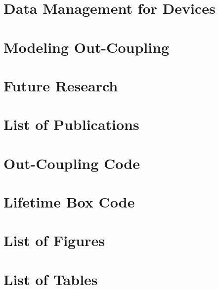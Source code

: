 \documentclass{article}
\begin{document}
\section{Data Management for Devices}

\newpage

\section{Modeling Out-Coupling}

\newpage

\section{Future Research}

\newpage




\newpage

\appendix
\appendixpage
\addappheadtotoc
\section{List of Publications}

\newpage

\section{Out-Coupling Code}
\newpage

\section{Lifetime Box Code}
\newpage

\section{List of Figures}
\listoffigures
\newpage

\section{List of Tables}
\listoftables
\newpage
\end{document}
